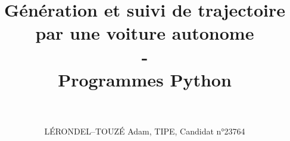 \documentclass[11pt,a4paper,openany]{extbook}
\begin{document}
\title{\Huge\textbf{Génération et suivi de trajectoire par une voiture autonome}\\ - \\\huge Programmes Python}
\author{\\ \\LÉRONDEL--TOUZÉ Adam, TIPE, Candidat n°23764}
\date{}
\maketitle
\tableofcontents










\end{document}
